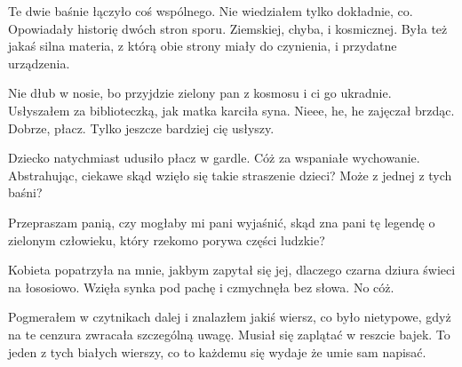 Te dwie baśnie łączyło coś wspólnego. Nie wiedziałem tylko dokładnie, co. Opowiadały historię dwóch stron sporu. Ziemskiej, chyba, i kosmicznej.
Była też jakaś silna materia, z którą obie strony miały do czynienia, i przydatne urządzenia.

\begin{dialogue}
	\ds{} Nie dłub w nosie, bo przyjdzie zielony pan z kosmosu i ci go ukradnie. \dm{} Usłyszałem za biblioteczką, jak matka karciła syna.
	\ds{} Nieee, he, he \dm{} zajęczał brzdąc.
	\ds{} Dobrze, płacz. Tylko jeszcze bardziej cię usłyszy.
\end{dialogue}

Dziecko natychmiast udusiło płacz w gardle.
Cóż za wspaniałe wychowanie.
Abstrahując, ciekawe skąd wzięło się takie straszenie dzieci? Może z jednej z tych baśni?

\begin{dialogue}
	\ds{} Przepraszam panią, czy mogłaby mi pani wyjaśnić, skąd zna pani tę legendę o zielonym człowieku, który rzekomo porywa części ludzkie?
\end{dialogue}

Kobieta popatrzyła na mnie, jakbym zapytał się jej, dlaczego czarna dziura świeci na łososiowo.
Wzięła synka pod pachę i czmychnęła bez słowa.
No cóż.

Pogmerałem w czytnikach dalej i znalazłem jakiś wiersz, co było nietypowe, gdyż na te cenzura zwracała szczególną uwagę. 
Musiał się zaplątać w reszcie bajek. To jeden z tych białych wierszy, co to każdemu się wydaje że umie sam napisać.

